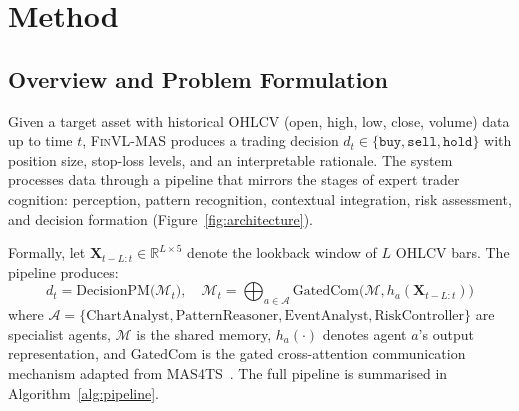 \section{Method}
\label{sec:method}

\subsection{Overview and Problem Formulation}

Given a target asset with historical OHLCV (open, high, low, close, volume) data up to time $t$, \textsc{FinVL-MAS} produces a trading decision $d_t \in \{\texttt{buy}, \texttt{sell}, \texttt{hold}\}$ with position size, stop-loss levels, and an interpretable rationale. The system processes data through a pipeline that mirrors the stages of expert trader cognition: perception, pattern recognition, contextual integration, risk assessment, and decision formation (Figure~\ref{fig:architecture}).

Formally, let $\mathbf{X}_{t-L:t} \in \mathbb{R}^{L \times 5}$ denote the lookback window of $L$ OHLCV bars. The pipeline produces:
\begin{equation}
    d_t = \text{DecisionPM}\Big(\mathcal{M}_t\Big), \quad \mathcal{M}_t = \bigoplus_{a \in \mathcal{A}} \text{GatedCom}\big(\mathcal{M}, h_a(\mathbf{X}_{t-L:t})\big)
\end{equation}
where $\mathcal{A} = \{\text{ChartAnalyst}, \text{PatternReasoner}, \text{EventAnalyst}, \text{RiskController}\}$ are specialist agents, $\mathcal{M}$ is the shared memory, $h_a(\cdot)$ denotes agent $a$'s output representation, and $\text{GatedCom}$ is the gated cross-attention communication mechanism adapted from MAS4TS~\cite{mas4ts2025}. The full pipeline is summarised in Algorithm~\ref{alg:pipeline}.

